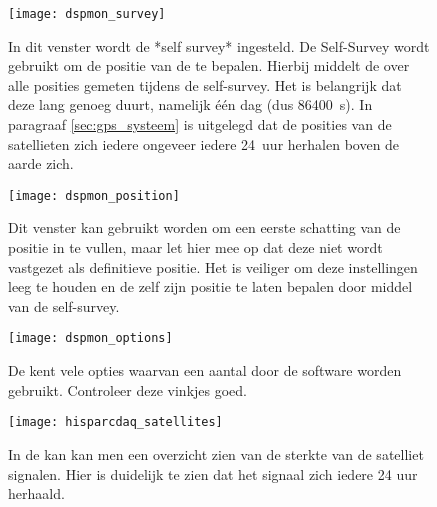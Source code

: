 \begin{figure}
    \centering
    \texttt{[image: dspmon\_survey]}
    \caption{In dit venster wordt de *self survey* ingesteld. De
    Self-Survey wordt gebruikt om de positie van de \gps te bepalen.
    Hierbij middelt de \gps over alle posities gemeten tijdens de
    self-survey. Het is belangrijk dat deze lang genoeg duurt, namelijk
    één dag (dus \SI{86400}{\second}). In paragraaf
    \ref{sec:gps_systeem} is uitgelegd dat de posities
    van de \gps satellieten zich iedere ongeveer iedere
    \SI{24}{uur} herhalen boven de aarde zich.}
    \label{fig:dspmon_survey}
\end{figure}
   
\begin{figure}
    \centering
    \texttt{[image: dspmon\_position]}
    \caption{Dit venster kan gebruikt worden om een eerste schatting van
    de positie in te vullen, maar let hier mee op dat deze niet wordt
    vastgezet als definitieve positie. Het is veiliger om deze
    instellingen leeg te houden en de \gps zelf zijn positie te laten
    bepalen door middel van de self-survey.}
    \label{fig:dspmon_position}
\end{figure}

\begin{figure}
    \centering
    \texttt{[image: dspmon\_options]}
    \caption{De \gps kent vele opties waarvan een aantal door de \hisparc
    software worden gebruikt. Controleer deze vinkjes goed.}
    \label{fig:dspmon_options}
\end{figure}

\begin{figure}
    \centering
    \texttt{[image: hisparcdaq\_satellites]}
    \caption{In de \hisparc \daq kan kan men een overzicht zien van de
    sterkte van de satelliet signalen. Hier is duidelijk te zien dat het
    signaal zich iedere 24 uur herhaald.}
    \label{fig:hisparcdaq_satellites}
\end{figure}



